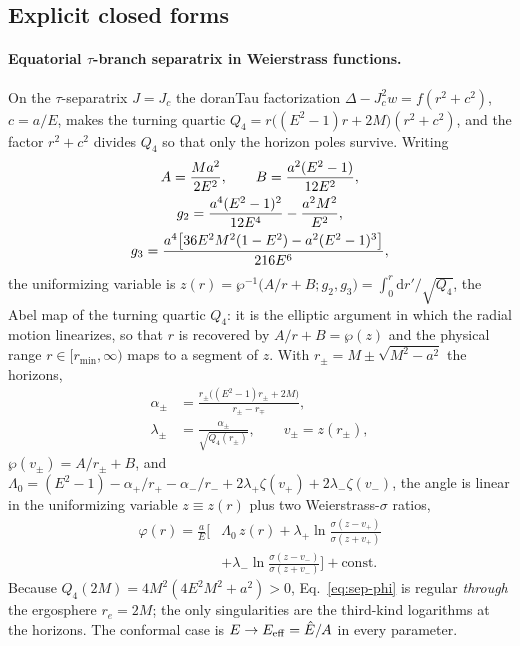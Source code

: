 \documentclass[
    aps, prd, twocolumn, superscriptaddress,
    showpacs, nofootinbib, floatfix
]{revtex4-2}
\newcommand{\Ehat}{\hat E}
\newcommand{\re}{r_{e}}
\newcommand{\Jc}{J_{c}}
\newcommand{\dd}{\mathrm{d}}
\begin{document}
\subsection{Explicit closed forms}
\label{app:explicit}

\paragraph{Equatorial $\tau$-branch separatrix in Weierstrass functions.} On the
$\tau$-separatrix $J=\Jc$ the doranTau factorization $\Delta-\Jc^2 w=f(r^2+c^2)$,
$c=a/E$, makes the
turning quartic $Q_4=r\big((E^2-1)r+2M\big)(r^2+c^2)$, and the factor $r^2+c^2$
divides $Q_4$ so that only the horizon poles survive. Writing
\begin{gather}
    A=\frac{Ma^2}{2E^2},\qquad B=\frac{a^2(E^2-1)}{12E^2},\notag\\
    g_2=\frac{a^4(E^2-1)^2}{12E^4}-\frac{a^2M^2}{E^2},\notag\\
    g_3=\frac{a^4\big[36E^2M^2(1-E^2)-a^2(E^2-1)^3\big]}{216E^6},
    \label{eq:wp-invariants}
\end{gather}
the uniformizing variable is $z(r)=\wp^{-1}\!\big(A/r+B;g_2,g_3\big)
=\int_0^r\dd r'/\sqrt{Q_4}$, the Abel map of the turning quartic $Q_4$: it is the
elliptic argument in which the radial motion linearizes, so that $r$ is recovered
by $A/r+B=\wp(z)$ and the physical range $r\in[r_{\min},\infty)$ maps to a
segment of $z$. With $r_\pm=M\pm\sqrt{M^2-a^2}$ the horizons,
\begin{equation}
\begin{aligned}
    \alpha_\pm&=\frac{r_\pm\big((E^2-1)r_\pm+2M\big)}{r_\pm-r_\mp},\\
    \lambda_\pm&=\frac{\alpha_\pm}{\sqrt{Q_4(r_\pm)}},\qquad v_\pm=z(r_\pm),
\end{aligned}
\end{equation}
$\wp(v_\pm)=A/r_\pm+B$, and
$\Lambda_0=(E^2-1)-\alpha_+/r_+-\alpha_-/r_-+2\lambda_+\zeta(v_+)+2\lambda_-\zeta(v_-)$,
the angle is linear in the uniformizing variable $z\equiv z(r)$ plus two
Weierstrass-$\sigma$ ratios,
\begin{equation}
\begin{split}
    \varphi(r)=\frac{a}{E}\Big[&\Lambda_0\,z(r)
      +\lambda_+\ln\frac{\sigma(z-v_+)}{\sigma(z+v_+)}\\
      &+\lambda_-\ln\frac{\sigma(z-v_-)}{\sigma(z+v_-)}\Big]+\text{const}.
\end{split}
    \label{eq:sep-phi}
\end{equation}
Because $Q_4(2M)=4M^2(4E^2M^2+a^2)>0$, Eq.~\eqref{eq:sep-phi} is regular
\emph{through} the ergosphere $\re=2M$; the only singularities are the
third-kind logarithms at the horizons. The conformal case is
$E\to E_{\rm eff}=\Ehat/A$ in every parameter.
\end{document}
